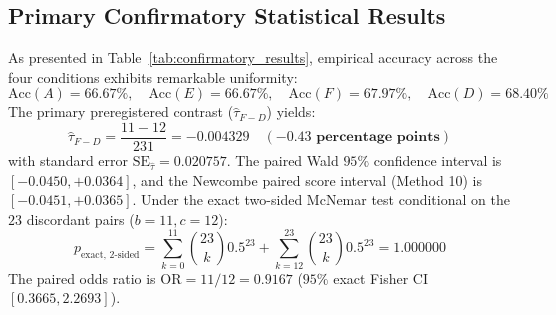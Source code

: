 \documentclass[11pt]{article}
\begin{document}
\begin{table}[t]
\centering
\caption{\textbf{Confirmatory Trial Results on Held-Out MATH-500 ($N=231$, Study 3).} Complete performance accounting across 924 physical GPU neural generations.}
\label{tab:confirmatory_results}
\end{table}

\subsection{Primary Confirmatory Statistical Results}
As presented in Table~\ref{tab:confirmatory_results}, empirical accuracy across the four conditions exhibits remarkable uniformity:
\begin{equation}
\text{Acc}(A) = 66.67\%, \quad \text{Acc}(E) = 66.67\%, \quad \text{Acc}(F) = 67.97\%, \quad \text{Acc}(D) = 68.40\%
\end{equation}
The primary preregistered contrast ($\hat{\tau}_{F-D}$) yields:
\begin{equation}
\hat{\tau}_{F-D} = \frac{11 - 12}{231} = \mathbf{-0.004329 \quad (-0.43\text{ percentage points})}
\end{equation}
with standard error $\text{SE}_{\hat{\tau}} = 0.020757$. The paired Wald $95\%$ confidence interval is $[-0.0450, +0.0364]$, and the Newcombe paired score interval (Method 10) is $[-0.0451, +0.0365]$. Under the exact two-sided McNemar test conditional on the $23$ discordant pairs ($b=11, c=12$):
\begin{equation}
p_{\text{exact, 2-sided}} = \sum_{k=0}^{11} \binom{23}{k} 0.5^{23} + \sum_{k=12}^{23} \binom{23}{k} 0.5^{23} = \mathbf{1.000000}
\end{equation}
The paired odds ratio is $\text{OR} = 11/12 = \mathbf{0.9167}$ ($95\%$ exact Fisher CI $[0.3665, 2.2693]$). 
\end{document}
